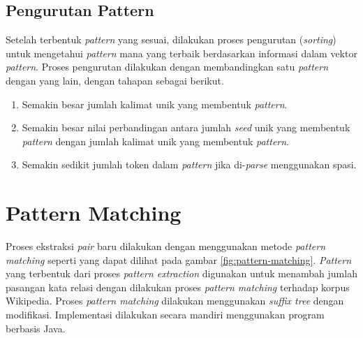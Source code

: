 
\subsection{Pengurutan Pattern}
Setelah terbentuk \textit{pattern} yang sesuai, dilakukan proses pengurutan (\textit{sorting}) untuk mengetahui \textit{pattern} mana yang terbaik berdasarkan informasi dalam vektor \textit{pattern}. Proses pengurutan dilakukan dengan membandingkan satu \textit{pattern} dengan yang lain, dengan tahapan sebagai berikut.
\begin{enumerate}
  \item Semakin besar jumlah kalimat unik yang membentuk \textit{pattern}.
  \item Semakin besar nilai perbandingan antara jumlah \textit{seed} unik yang membentuk \textit{pattern} dengan jumlah kalimat unik yang membentuk \textit{pattern}.
  \item Semakin sedikit jumlah token dalam \textit{pattern} jika di-\textit{parse} menggunakan spasi.
\end{enumerate}

%
\section{Pattern Matching}
Proses ekstraksi \textit{pair} baru dilakukan dengan menggunakan metode \textit{pattern matching} seperti yang dapat dilihat pada gambar \ref{fig:pattern-matching}. \textit{Pattern} yang terbentuk dari proses \textit{pattern extraction} digunakan untuk menambah jumlah pasangan kata relasi dengan dilakukan proses \textit{pattern matching} terhadap korpus Wikipedia. Proses \textit{pattern matching} dilakukan menggunakan \textit{suffix tree} dengan modifikasi. Implementasi dilakukan secara mandiri menggunakan program berbasis Java.

